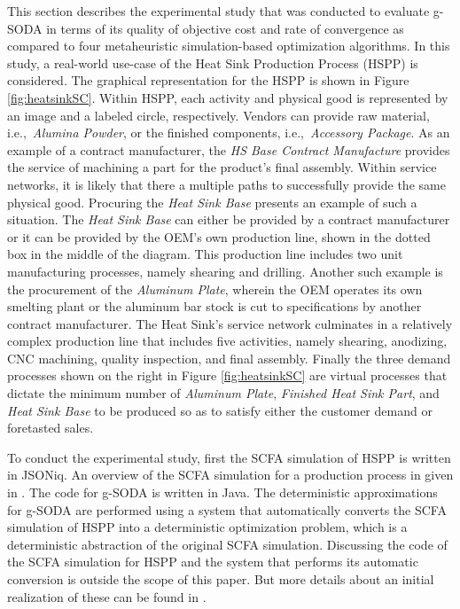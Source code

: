 \documentclass[a4paper, 12pt]{article} %
\begin{document}
This section describes the experimental study that was conducted to evaluate g-SODA in terms of its quality of objective cost and rate of convergence as compared to four metaheuristic simulation-based optimization algorithms. 
In this study, a real-world use-case of the Heat Sink Production Process (HSPP) is considered.
The graphical representation for the HSPP  is shown in Figure \ref{fig:heatsinkSC}.
Within HSPP, each activity and physical good is represented by an image and a labeled circle, respectively.  Vendors can provide raw material, i.e.,\ \textit{Alumina Powder}, or the finished components, i.e.,\ \textit{Accessory Package}.  As an example of a contract manufacturer, the \textit{HS Base Contract Manufacture} provides the service of machining a part for the product's final assembly.  Within service networks, it is likely that there a multiple paths to successfully provide the same physical good. Procuring the \textit{Heat Sink Base} presents an example of such a situation.  The \textit{Heat Sink Base} can either be provided by a contract manufacturer or it can be provided by the OEM's own production line, shown in the dotted box in the middle of the diagram.  This production line includes two unit manufacturing processes, namely shearing and drilling.  Another such example is the procurement of the \textit{Aluminum Plate}, wherein the OEM operates its own smelting plant or the aluminum bar stock is cut to specifications by another contract manufacturer. The Heat Sink's service network culminates in a relatively complex production line that includes five activities, namely shearing, anodizing, CNC machining, quality inspection, and final assembly. 
Finally the three demand processes shown on the right in Figure \ref{fig:heatsinkSC} are virtual processes that dictate the minimum number of \textit{Aluminum Plate}, \textit{Finished Heat Sink Part}, and \textit{Heat Sink Base} to be produced so as to satisfy either the customer demand or foretasted sales. 

To conduct the experimental study, first the SCFA simulation of HSPP is written in JSONiq. An overview of the SCFA simulation for a production process in given in \cite{GMU-CS-TR-2017-3}.  The code for g-SODA is written in Java. The deterministic approximations for g-SODA are performed using a system that automatically converts the SCFA simulation of HSPP into a deterministic optimization problem, which is a deterministic abstraction of the original SCFA simulation. Discussing the code of the SCFA simulation for HSPP and the system that performs its automatic conversion is outside the scope of this paper. But more details about an initial realization of these can be found in \cite{Brodsky2016ieeebd,Brodsky2017ieeebd}.
\end{document}
